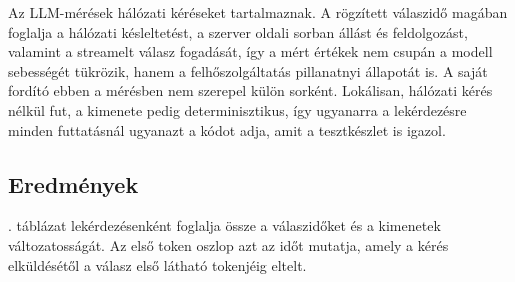 \documentclass[a4paper,12pt]{article}
\begin{document}
Az LLM-mérések hálózati kéréseket tartalmaznak. A rögzített válaszidő magában foglalja a hálózati késleltetést, a szerver oldali sorban állást és feldolgozást, valamint a streamelt válasz fogadását, így a mért értékek nem csupán a modell sebességét tükrözik, hanem a felhőszolgáltatás pillanatnyi állapotát is. A saját fordító ebben a mérésben nem szerepel külön sorként. Lokálisan, hálózati kérés nélkül fut, a kimenete pedig determinisztikus, így ugyanarra a lekérdezésre minden futtatásnál ugyanazt a kódot adja, amit a tesztkészlet is igazol.

\subsection{Eredmények}

. táblázat lekérdezésenként foglalja össze a válaszidőket és a kimenetek változatosságát. Az első token oszlop azt az időt mutatja, amely a kérés elküldésétől a válasz első látható tokenjéig eltelt.
\end{document}
